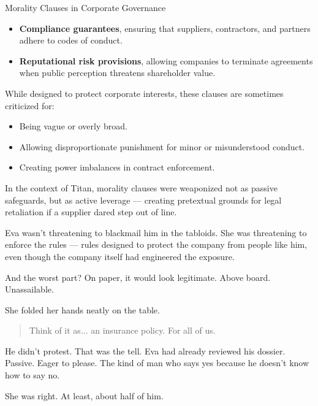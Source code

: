 \begin{HistoricalSidebar}{Morality Clauses in Corporate Governance}
    \begin{itemize}
        \item \textbf{Compliance guarantees}, ensuring that suppliers, contractors, and partners adhere to codes of conduct.
        \item \textbf{Reputational risk provisions}, allowing companies to terminate agreements when public perception threatens shareholder value.
    \end{itemize}
    
    \medskip
    
    While designed to protect corporate interests, these clauses are sometimes criticized for:

    \medskip

    \begin{itemize}
        \item Being vague or overly broad.
        \item Allowing disproportionate punishment for minor or misunderstood conduct.
        \item Creating power imbalances in contract enforcement.
    \end{itemize}

    \medskip
    
    In the context of Titan, morality clauses were weaponized not as passive safeguards, but as active leverage — creating pretextual grounds for legal retaliation if a supplier dared step out of line.
    
\end{HistoricalSidebar}

\medskip

Eva wasn’t threatening to blackmail him in the tabloids.
She was threatening to enforce the rules — rules designed to protect the company from people like him, even though the company itself had engineered the exposure.

And the worst part?
On paper, it would look legitimate.
Above board.
Unassailable.

She folded her hands neatly on the table.

\begin{quote}
Think of it as... an insurance policy. For all of us.
\end{quote}

He didn’t protest. That was the tell.
Eva had already reviewed his dossier.
Passive. Eager to please.
The kind of man who says yes because he doesn’t know how to say no.

She was right.
At least, about half of him.

